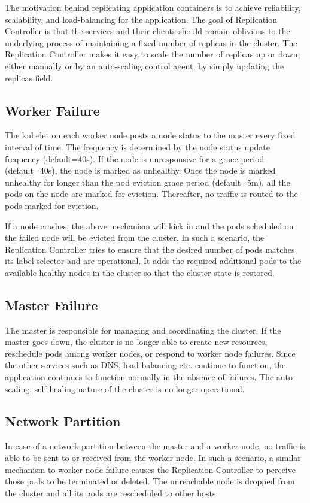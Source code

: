 \documentclass[sigconf]{acmart}
\begin{document}
The motivation behind replicating application containers is to achieve reliability, scalability, and load-balancing for the application. The goal of Replication Controller is that the services and their clients should remain oblivious to the underlying process of maintaining a fixed number of replicas in the cluster. The Replication Controller makes it easy to scale the number of replicas up or down, either manually or by an auto-scaling control agent, by simply updating the replicas field.


\subsection{Worker Failure}
The kubelet on each worker node posts a node status to the master every fixed interval of time. The frequency is determined by the node status update frequency (default=40s). If the node is unresponsive for a grace period (default=40s), the node is marked as unhealthy. Once the node is marked unhealthy for longer than the pod eviction grace period (default=5m), all the pods on the node are marked for eviction. Thereafter, no traffic is routed to the pods marked for eviction.

If a node crashes, the above mechanism will kick in and the pods scheduled on the failed node will be evicted from the cluster. In such a scenario, the Replication Controller tries to ensure that the desired number of pods matches its label selector and are operational. It adds the required additional pods to the available healthy nodes in the cluster so that the cluster state is restored.

\subsection{Master Failure}
The master is responsible for managing and coordinating the cluster. If the master goes down, the cluster is no longer able to create new resources, reschedule pods among worker nodes, or respond to worker node failures. Since the other services such as DNS, load balancing etc. continue to function, the application  continues to function normally in the absence of failures. The auto-scaling, self-healing nature of the cluster is no longer operational.

\subsection{Network Partition}
In case of a network partition between the master and a worker node, no traffic is able to be sent to or received from the worker node. In such a scenario, a similar mechanism to worker node failure causes the Replication Controller to perceive those pods to be terminated or deleted. The unreachable node is dropped from the cluster and all its pods are rescheduled to other hosts.
\end{document}

